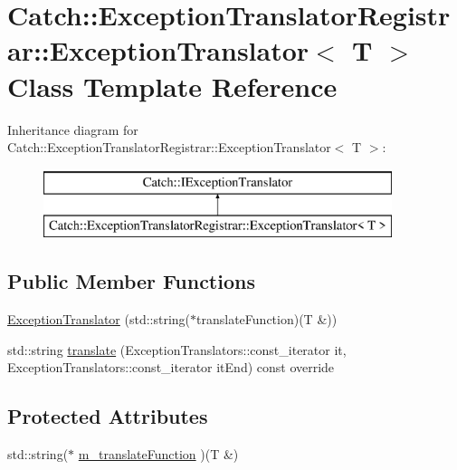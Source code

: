 \hypertarget{classCatch_1_1ExceptionTranslatorRegistrar_1_1ExceptionTranslator}{}\section{Catch\+:\+:Exception\+Translator\+Registrar\+:\+:Exception\+Translator$<$ T $>$ Class Template Reference}
\label{classCatch_1_1ExceptionTranslatorRegistrar_1_1ExceptionTranslator}
Inheritance diagram for Catch\+:\+:Exception\+Translator\+Registrar\+:\+:Exception\+Translator$<$ T $>$\+:\begin{figure}[H]
\begin{center}
\leavevmode
\includegraphics[height=2.000000cm]{classCatch_1_1ExceptionTranslatorRegistrar_1_1ExceptionTranslator}
\end{center}
\end{figure}
\subsection*{Public Member Functions}
\begin{DoxyCompactItemize}
\item 
\mbox{\hyperlink{classCatch_1_1ExceptionTranslatorRegistrar_1_1ExceptionTranslator_a2de4e9bcaad47996159763e69f614d7a}{Exception\+Translator}} (std\+::string($\ast$translate\+Function)(T \&))
\item 
std\+::string \mbox{\hyperlink{classCatch_1_1ExceptionTranslatorRegistrar_1_1ExceptionTranslator_a29e85940ee9ce719f26e43550cb4ed48}{translate}} (Exception\+Translators\+::const\+\_\+iterator it, Exception\+Translators\+::const\+\_\+iterator it\+End) const override
\end{DoxyCompactItemize}
\subsection*{Protected Attributes}
\begin{DoxyCompactItemize}
\item 
std\+::string($\ast$ \mbox{\hyperlink{classCatch_1_1ExceptionTranslatorRegistrar_1_1ExceptionTranslator_a488013ff0869785c9d041443fbf9a757}{m\+\_\+translate\+Function}} )(T \&)
\end{DoxyCompactItemize}



